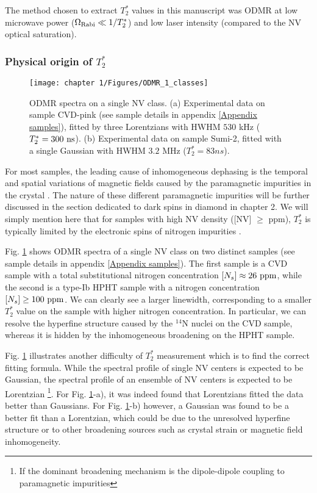 \documentclass[a4paper, 11pt]{report}
\begin{document}
The method chosen to extract $T_2^*$ values in this manuscript was ODMR at low microwave power ($\Omega_{\rm Rabi} \ll 1/T_2^*$) and low laser intensity (compared to the NV optical saturation).

\subsubsection{Physical origin of $T_2^*$}

\begin{figure}[h!]
\centering
\texttt{[image: chapter 1/Figures/ODMR\_1\_classes]}
\caption{ODMR spectra on a single NV class. (a) Experimental data on sample CVD-pink (see sample details in appendix \ref{Appendix samples}), fitted by three Lorentzians with HWHM $530$ kHz ($T_2^*=300\ \rm ns$). (b) Experimental data on sample Sumi-2, fitted with a single Gaussian with HWHM $3.2$ MHz ($T_2^*=83 ns$).}
\label{ODMR 1 classe}
\end{figure}

For most samples, the leading cause of inhomogeneous dephasing is the temporal and spatial variations of magnetic fields caused by the paramagnetic impurities in the crystal \citep{barry2020sensitivity}. The nature of these different paramagnetic impurities will be further discussed in the section dedicated to dark spins in diamond in chapter 2. We will simply mention here that for samples with high NV density ([NV] $\geq$ ppm), $T_2^*$ is typically limited by the electronic spins of nitrogen impurities \citep{bauch2018ultralong}.

Fig. \ref{ODMR 1 classe} shows ODMR spectra of a single NV class on two distinct samples (see sample details in appendix \ref{Appendix samples}). The first sample is a CVD sample with a total substitutional nitrogen concentration $[N_s] \approx 26\ \rm ppm$, while the second is a type-Ib HPHT sample with a nitrogen concentration $[N_s] \geq 100\ \rm ppm$. We can clearly see a larger linewidth, corresponding to a smaller $T_2^*$ value on the sample with higher nitrogen concentration. In particular, we can resolve the hyperfine structure caused by the $^{14}$N nuclei on the CVD sample, whereas it is hidden by the inhomogeneous broadening on the HPHT sample.

Fig. \ref{ODMR 1 classe} illustrates another difficulty of $T_2^*$ measurement which is to find the correct fitting formula. While the spectral profile of single NV centers is expected to be Gaussian, the spectral profile of an ensemble of NV centers is expected to be Lorentzian \citep{dobrovitski2008decoherence, hall2014analytic} \footnote{If the dominant broadening mechanism is the dipole-dipole coupling to paramagnetic impurities}. For Fig. \ref{ODMR 1 classe}-a), it was indeed found that Lorentzians fitted the data better than Gaussians. For Fig. \ref{ODMR 1 classe}-b) however, a Gaussian was found to be a better fit than a Lorentzian, which could be due to the unresolved hyperfine structure or to other broadening sources such as crystal strain or magnetic field inhomogeneity.
\end{document}
